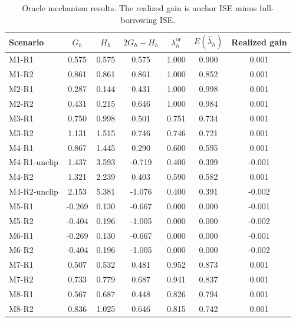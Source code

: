 \begin{table}[p]
\centering
\caption{Oracle mechanism results. The realized gain is anchor ISE minus full-borrowing ISE.}
\label{tab:sim-oracle}
\begin{tabular}{lcccccc}
\toprule
Scenario & $G_h$ & $H_h$ & $2G_h-H_h$ & $\lambda_h^{\mathrm{or}}$ & $E(\widehat\lambda_h)$ & Realized gain \\
\midrule
M1-R1 & 0.575 & 0.575 & 0.575 & 1.000 & 0.900 & 0.001 \\
M1-R2 & 0.861 & 0.861 & 0.861 & 1.000 & 0.852 & 0.001 \\
M2-R1 & 0.287 & 0.144 & 0.431 & 1.000 & 0.998 & 0.001 \\
M2-R2 & 0.431 & 0.215 & 0.646 & 1.000 & 0.984 & 0.001 \\
M3-R1 & 0.750 & 0.998 & 0.501 & 0.751 & 0.734 & 0.001 \\
M3-R2 & 1.131 & 1.515 & 0.746 & 0.746 & 0.721 & 0.001 \\
M4-R1 & 0.867 & 1.445 & 0.290 & 0.600 & 0.595 & 0.001 \\
M4-R1-unclip & 1.437 & 3.593 & -0.719 & 0.400 & 0.399 & -0.001 \\
M4-R2 & 1.321 & 2.239 & 0.403 & 0.590 & 0.582 & 0.001 \\
M4-R2-unclip & 2.153 & 5.381 & -1.076 & 0.400 & 0.391 & -0.002 \\
M5-R1 & -0.269 & 0.130 & -0.667 & 0.000 & 0.000 & -0.001 \\
M5-R2 & -0.404 & 0.196 & -1.005 & 0.000 & 0.000 & -0.002 \\
M6-R1 & -0.269 & 0.130 & -0.667 & 0.000 & 0.000 & -0.001 \\
M6-R2 & -0.404 & 0.196 & -1.005 & 0.000 & 0.000 & -0.002 \\
M7-R1 & 0.507 & 0.532 & 0.481 & 0.952 & 0.873 & 0.001 \\
M7-R2 & 0.733 & 0.779 & 0.687 & 0.941 & 0.837 & 0.001 \\
M8-R1 & 0.567 & 0.687 & 0.448 & 0.826 & 0.794 & 0.001 \\
M8-R2 & 0.836 & 1.025 & 0.646 & 0.815 & 0.742 & 0.001 \\
\bottomrule
\end{tabular}
\end{table}
